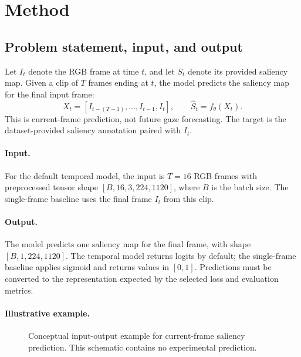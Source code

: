 \documentclass[10pt,twocolumn,letterpaper]{article}
\begin{document}
\section{Method}
\label{sec:method}

\subsection{Problem statement, input, and output}

Let \(I_t\) denote the RGB frame at time \(t\), and let \(S_t\) denote its
provided saliency map. Given a clip of \(T\) frames ending at \(t\), the model
predicts the saliency map for the final input frame:
\begin{equation}
    X_t = [I_{t-(T-1)}, \ldots, I_{t-1}, I_t],
    \qquad
    \hat{S}_t = f_\theta(X_t).
    \label{eq:task}
\end{equation}
This is current-frame prediction, not future gaze forecasting. The target is
the dataset-provided saliency annotation paired with \(I_t\).

\paragraph{Input.}
For the default temporal model, the input is \(T=16\) RGB frames with
preprocessed tensor shape \([B,16,3,224,1120]\), where \(B\) is the batch
size. The single-frame baseline uses the final frame \(I_t\) from this clip.

\paragraph{Output.}
The model predicts one saliency map for the final frame, with shape
\([B,1,224,1120]\). The temporal model returns logits by default; the
single-frame baseline applies sigmoid and returns values in \([0,1]\).
Predictions must be converted to the representation expected by the selected
loss and evaluation metrics.

\paragraph{Illustrative example.}
\begin{figure}[t]
    \centering
    \caption{Conceptual input-output example for current-frame saliency
    prediction. This schematic contains no experimental prediction.}
    \label{fig:io-example}
\end{figure}
\end{document}
